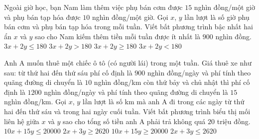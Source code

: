 \begin{ex}%
	Ngoài giờ học, bạn Nam làm thêm việc phụ bán cơm được $15$ nghìn đồng/một giờ và phụ bán tạp hóa được $10$ nghìn đồng/một giờ. Gọi $x$, $y$ lần lượt là số giờ phụ bán cơm và phụ bán tạp hóa trong mỗi tuần. Viết bất phương trình bậc nhất hai ẩn $x$ và $y$ sao cho Nam kiếm thêm tiền mỗi tuần được ít nhất là $900$ nghìn đồng.
	\choice
	{$3x+2y\le 180$}
	{$3x+2y> 180$}
	{\True $3x+2y\ge 180$}
	{$3x+2y< 180$}
\end{ex}


\begin{ex}%
	Anh A muốn thuê một chiếc ô tô (có người lái) trong một tuần. Giá thuê xe như sau: từ thứ hai đến thứ sáu phí cố định là $900$ nghìn đồng/ngày và phí tính theo quãng đường di chuyển là $10$ nghìn đồng/km còn thứ bảy và chủ nhật thì phí cố định là $1200$ nghìn đồng/ngày và phí tính theo quãng đường di chuyển là $15$ nghìn đồng/km. Gọi $x$, $y$ lần lượt là số km mà anh A đi trong các ngày từ thứ hai đến thứ sáu và trong hai ngày cuối tuần. Viết bất phương trình biểu thị mối liên hệ giữa $x$ và $y$ sao cho tổng số tiền anh A phải trả không quá $20$ triệu đồng.
	\choice
	{$10x+15y\le 20000$}
	{$2x+3y\ge 2620$}
	{$10x+15y\ge 20000$}
	{\True $2x+3y\le 2620$}
\end{ex}

